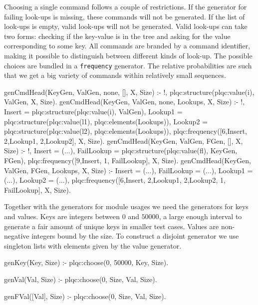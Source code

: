 \documentclass[11pt]{article}
\newcommand{\yap}[1]{\lstinline[style=yap]{#1}}
\begin{document}
Choosing a single command follows a couple of restrictions.
%
If the generator for failing look-ups is missing, these commands will
not be generated.
%
If the list of look-ups is empty, valid look-ups will not be generated.
%
Valid look-ups can take two forms: checking if the key-value is in the
tree and asking for the value corresponding to some key.
%
All commands are branded by a command identifier, making it possible to
distinguish between different kinds of look-up.
%
The possible choices are bundled in a \yap{frequency} generator.
%
The relative probabilities are such that we get a big variety of commands within
relatively small sequences. 
%
\begin{yapcode}
 genCmdHead(KeyGen, ValGen, none, [], X, Size) :- !,
   plqc:structure({plqc:value(i), ValGen}, X, Size).
 genCmdHead(KeyGen, ValGen, none, Lookups, X, Size) :- !,
   Insert = plqc:structure({plqc:value(i), ValGen}),
   Lookup1 = plqc:structure({plqc:value(l1), plqc:elements(Lookups)}),
   Lookup2 = plqc:structure({plqc:value(l2), plqc:elements(Lookups)}),
   plqc:frequency([{6,Insert}, {2,Lookup1}, {2,Lookup2}], X, Size).
 genCmdHead(KeyGen, ValGen, FGen, [], X, Size) :- !,
   Insert = (...),
   FailLookup = plqc:structure({plqc:value(fl), {KeyGen, FGen}}),
   plqc:frequency([{9,Insert}, {1, FailLookup}], X, Size).
 genCmdHead(KeyGen, ValGen, FGen, Lookups, X, Size) :-
   Insert = (...), FailLookup = (...),
   Lookup1 = (...), Lookup2 = (...),
   plqc:frequency([{6,Insert}, {2,Lookup1}, {2,Lookup2}, {1, FailLookup}], X, Size).
\end{yapcode}


Together with the generators for module usages we need the generators
for keys and values.
%
Keys are integers between $0$ and $50000$, a large enough interval to
generate a fair amount of unique keys in smaller test cases.
%
Values are non-negative integers bound by the size.
%
To construct a disjoint generator we use singleton lists with elements
given by the value generator.
\begin{yapcode}
 genKey(Key, Size) :- plqc:choose(0, 50000, Key, Size).

 genVal(Val, Size) :- plqc:choose(0, Size, Val, Size).

 genFVal([Val], Size) :- plqc:choose(0, Size, Val, Size).
\end{yapcode}
\end{document}
